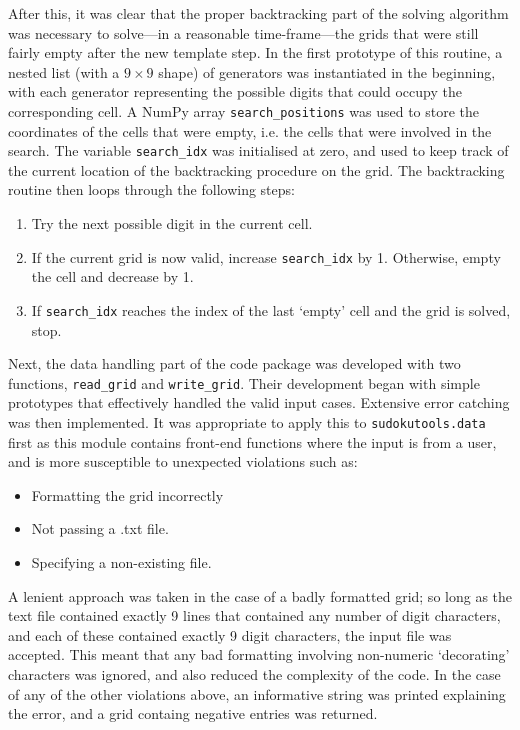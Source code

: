 \documentclass[12pt]{article}
\begin{document}
After this, it was clear that the proper backtracking part of the solving algorithm was necessary to solve---in a reasonable time-frame---the grids that were still fairly empty after the new template step.
In the first prototype of this routine, a nested list (with a $9\times9$ shape) of generators was instantiated in the beginning, with each generator representing the possible digits that could occupy the corresponding cell.
A NumPy array \texttt{search\_positions} was used to store the coordinates of the cells that were empty, i.e. the cells that were involved in the search.
The variable \texttt{search\_idx} was initialised at zero, and used to keep track of the current location of the backtracking procedure on the grid.
The backtracking routine then loops through the following steps:
\begin{enumerate}
    \item Try the next possible digit in the current cell.
    \item If the current grid is now valid, increase \texttt{search\_idx} by 1. Otherwise, empty the cell and decrease by 1.
    \item If \texttt{search\_idx} reaches the index of the last `empty' cell and the grid is solved, stop.
\end{enumerate}

Next, the data handling part of the code package was developed with two functions, \texttt{read\_grid} and \texttt{write\_grid}.
Their development began with simple prototypes that effectively handled the valid input cases.
Extensive error catching was then implemented.
It was appropriate to apply this to \texttt{sudokutools.data} first as this module contains front-end functions where the input is from a user, and is more susceptible to unexpected violations such as:
\begin{itemize}
    \item Formatting the grid incorrectly
    \item Not passing a .txt file.
    \item Specifying a non-existing file.
\end{itemize}
A lenient approach was taken in the case of a badly formatted grid; so long as the text file contained exactly 9 lines that contained any number of digit characters, and each of these contained exactly 9 digit characters, the input file was accepted.
This meant that any bad formatting involving non-numeric `decorating' characters was ignored, and also reduced the complexity of the code.
In the case of any of the other violations above, an informative string was printed explaining the error, and a grid containg negative entries was returned.
\end{document}
